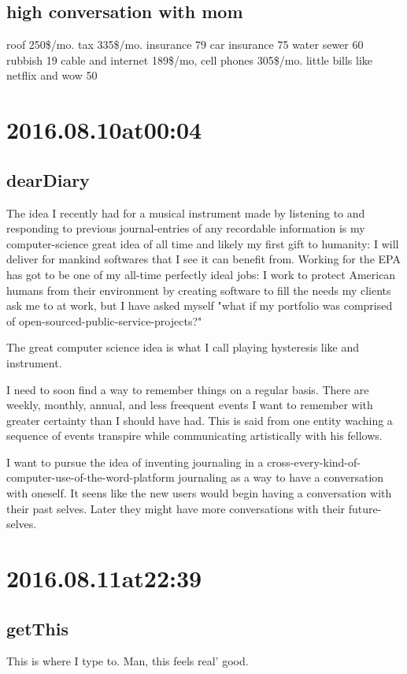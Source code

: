 \subsection*{ high conversation with mom }
roof 250\$/mo.
tax 335\$/mo.
insurance 79
car insurance 75
water sewer 60
rubbish 19
cable and internet 189\$/mo,
cell phones 305\$/mo.
little bills like netflix and wow 50

\section*{ 2016.08.10at00:04 }
\subsection*{ dearDiary }
The idea I recently had for a musical instrument made by listening to and responding to previous journal-entries of any recordable information is my computer-science great idea of all time and likely my first gift to humanity: I will deliver for mankind softwares that I see it can benefit from. Working for the EPA has got to be one of my all-time perfectly ideal jobs: I work to protect American humans from their environment by creating software to fill the needs my clients ask me to at work, but I have asked myself "what if my portfolio was comprised of open-sourced-public-service-projects?"

The great computer science idea is what I call playing hysteresis like and instrument. 

I need to soon find a way to remember things on a regular basis. There are weekly, monthly, annual, and less freequent events I want to remember with greater certainty than I should have had. This is said from one entity waching a sequence of events transpire while communicating artistically with his fellows.

		I want to pursue the idea of inventing journaling in a cross-every-kind-of-computer-use-of-the-word-platform journaling as a way to have a conversation with oneself. It seens like the new users would begin having a conversation with their past selves. Later they might have more conversations with their future-selves.

\section*{ 2016.08.11at22:39 }
\subsection*{getThis}
This is where I type to. Man, this feels real' good. 

